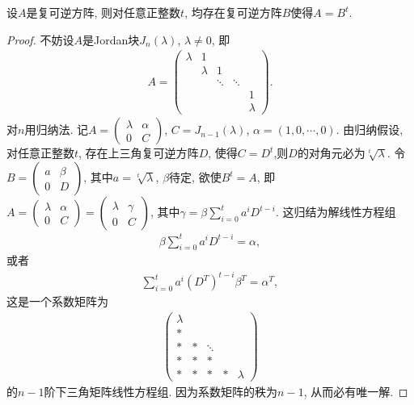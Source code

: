\documentclass[../../main.tex]{subfiles}%
\begin{document}
\begin{proposition}\label{proposition:可逆复方阵必可开任意根}
设$A$是复可逆方阵, 则对任意正整数$t$, 均存在复可逆方阵$B$使得$A=B^t$.
\end{proposition}
\begin{proof}
不妨设$A$是Jordan块$J_n(\lambda)$, $\lambda\neq 0$, 即
\begin{align*}
A=\begin{pmatrix}
\lambda & 1 & & & \\
& \lambda & 1 & & \\
& & \ddots & \ddots & \\
& & & & 1 \\
& & & & \lambda
\end{pmatrix}.
\end{align*}
对$n$用归纳法. 记$A=\begin{pmatrix} \lambda & \alpha \\ 0 & C \end{pmatrix}$, $C=J_{n-1}(\lambda)$, $\alpha=(1,0,\cdots,0)$. 由归纳假设, 对任意正整数$t$, 存在上三角复可逆方阵$D$, 使得$C=D^t$,则$D$的对角元必为$\sqrt[t]{\lambda}$. 令$B=\begin{pmatrix} a & \beta \\ 0 & D \end{pmatrix}$, 其中$a=\sqrt[t]{\lambda}$, $\beta$待定, 欲使$B^t=A$, 即$A=\begin{pmatrix} \lambda & \alpha \\ 0 & C \end{pmatrix}=\begin{pmatrix} \lambda & \gamma \\ 0 & C \end{pmatrix}$, 其中$\gamma=\beta\sum\limits_{i=0}^{t}a^i D^{t-i}$. 这归结为解线性方程组
\begin{align*}
\beta\sum\limits_{i=0}^{t}a^i D^{t-i} = \alpha,
\end{align*}
或者
\begin{align*}
\sum\limits_{i=0}^{t}a^i (D^{T})^{t-i} \beta^{T} = \alpha^{T},
\end{align*}
 这是一个系数矩阵为
\begin{align*}
\begin{pmatrix}
\lambda & & & & \\
* & & & & \\
* & * & \ddots & & \\
* & * & * & & \\
* & * & * & * & \lambda
\end{pmatrix}
\end{align*}
的$n-1$阶下三角矩阵线性方程组. 因为系数矩阵的秩为$n-1$, 从而必有唯一解.
\end{proof}
\end{document}
